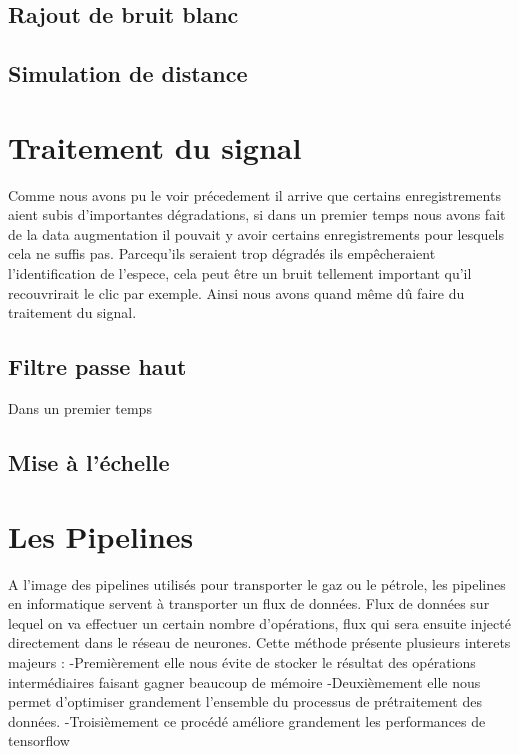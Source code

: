 \hypertarget{Rajout-de-bruit-blanc}{%
\subsection{Rajout de bruit blanc}
\label{Rajout-de-bruit-blanc}}

\hypertarget{Simulation-de-distance}{%
\subsection{Simulation de distance}
\label{Simulation-de-distance}}

\hypertarget{Traitement-du-signal}{%
\section{Traitement du signal}
\label{Traitement-du-signal}}

Comme nous avons pu le voir précedement il arrive que certains enregistrements aient subis d'importantes dégradations, si dans un premier temps nous avons fait de la data augmentation il pouvait y avoir certains enregistrements pour lesquels cela ne suffis pas. Parcequ'ils seraient trop dégradés ils empêcheraient l'identification de l'espece, cela peut être un bruit tellement important qu'il recouvrirait le clic par exemple. Ainsi nous avons quand même dû faire du traitement du signal.

\hypertarget{Filtre-passe-haut}{%
\subsection{Filtre passe haut}
\label{Filtre-passe-haut}}

Dans un premier temps

\hypertarget{}{%
\subsection{Mise à l'échelle}
\label{}}


\hypertarget{Les-Pipelines}{%
\section{Les Pipelines}
\label{Les-Pipelines}}

A l'image des pipelines utilisés pour transporter le gaz ou le pétrole, les pipelines en informatique servent à transporter un flux de données.
Flux de données sur lequel on va effectuer un certain nombre d'opérations, flux qui sera ensuite injecté directement dans le réseau de neurones.
Cette méthode présente plusieurs interets majeurs :
-Premièrement elle nous évite de stocker le résultat des opérations intermédiaires  faisant gagner beaucoup de mémoire
-Deuxièmement elle nous permet d'optimiser grandement l'ensemble du processus de prétraitement des données.
-Troisièmement ce procédé améliore grandement les performances de tensorflow


